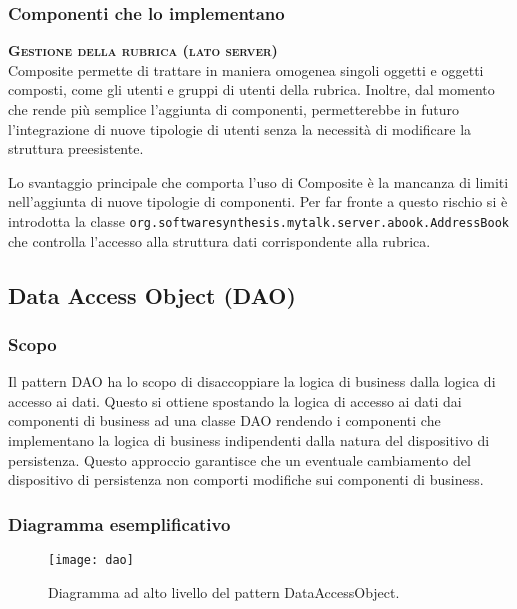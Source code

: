 \subsubsection{Componenti che lo implementano}
\begin{description}
\item{\bfseries\scshape Gestione della rubrica (lato server)}\\
Composite permette di trattare in maniera omogenea singoli oggetti e oggetti composti, come gli utenti e gruppi di utenti della rubrica. Inoltre, dal momento che rende più semplice l'aggiunta di componenti, permetterebbe in futuro l'integrazione di nuove tipologie di utenti senza la necessità di modificare la struttura preesistente.

Lo svantaggio principale che comporta l'uso di Composite è la mancanza di limiti nell'aggiunta di nuove tipologie di componenti. Per far fronte a questo rischio si è introdotta la classe \texttt{org.softwaresynthesis.mytalk.server.abook.AddressBook} che controlla l'accesso alla struttura dati corrispondente alla rubrica.
\end{description}

\subsection{Data Access Object (DAO)}

\subsubsection{Scopo}
Il pattern DAO ha lo scopo di disaccoppiare la logica di business dalla logica di accesso ai dati. Questo si ottiene spostando la logica di accesso ai dati dai componenti di business ad una classe DAO rendendo i componenti che implementano la logica di business indipendenti dalla natura del dispositivo di persistenza. Questo approccio garantisce che un eventuale cambiamento del dispositivo di persistenza non comporti modifiche sui componenti di business.

\subsubsection{Diagramma esemplificativo}
\begin{figure}[H]
\centering
\texttt{[image: dao]}
\caption{Diagramma ad alto livello del pattern DataAccessObject.}\label{fig:dao}
\end{figure}

